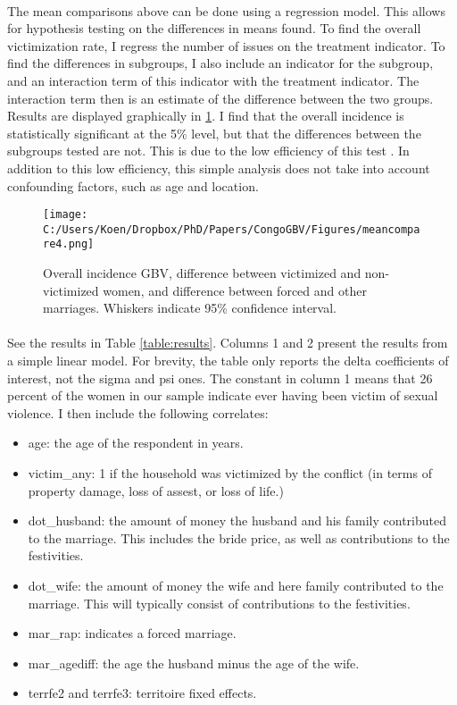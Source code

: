 \documentclass[11pt,a4paper]{scrartcl} %
\begin{document}
\paragraph{}
The mean comparisons above can be done using a regression model. This allows for hypothesis testing on the differences in means found. To find the overall victimization rate, I regress the number of issues on the treatment indicator. To find the differences in subgroups, I also include an indicator for the subgroup, and an interaction term of this indicator with the treatment indicator. The interaction term then is an estimate of the difference between the two groups. Results are displayed graphically in \ref{fig:meancompare4}. I find that the overall incidence is statistically significant at the 5\% level, but that the differences between the subgroups tested are not. This is due to the low efficiency of this test \cite{Imai2011}. In addition to this low efficiency, this simple analysis does not take into account confounding factors, such as age and location.

\begin{figure}
  \texttt{[image: C:/Users/Koen/Dropbox/PhD/Papers/CongoGBV/Figures/meancompare4.png]}
  \caption{Overall incidence GBV, difference between victimized and non-victimized women, and difference between forced and other marriages. Whiskers indicate 95\% confidence interval.}
  \label{fig:meancompare4}
\end{figure}

\paragraph{}
See the results in Table \ref{table:results}. Columns 1 and 2 present the results from a simple linear model. For brevity, the table only reports the delta coefficients of interest, not the sigma and psi ones. The constant in column 1 means that 26 percent of the women in our sample indicate ever having been victim of sexual violence. 
I then include the following correlates:
\begin{itemize}
	\item age: the age of the respondent in years.
	\item victim\_any: 1 if the household was victimized by the conflict (in terms of property damage, loss of assest, or loss of life.)
	\item dot\_husband: the amount of money the husband and his family contributed to the marriage. This includes the bride price, as well as contributions to the festivities.
	\item dot\_wife: the amount of money  the wife and here family contributed to the marriage. This will typically consist of contributions to the festivities.
	\item mar\_rap: indicates a forced marriage.
	\item mar\_agediff: the age the husband minus the age of the wife.
	\item terrfe2 and terrfe3: territoire fixed effects.
\end{itemize}
\end{document}
